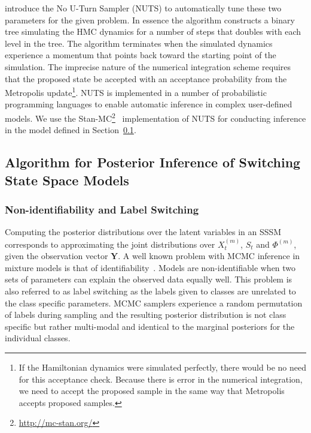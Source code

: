 \cite{hoffman2014no} introduce the No U-Turn Sampler (NUTS) to automatically tune these two parameters for the given problem. In essence the algorithm constructs a binary tree simulating the HMC dynamics for a number of steps that doubles with each level in the tree. The algorithm terminates when the simulated dynamics experience a momentum that points back toward the starting point of the simulation. The imprecise nature of the numerical integration scheme requires that the proposed state be accepted with an acceptance probability from the Metropolis update\footnote{If the Hamiltonian dynamics were simulated perfectly, there would be no need for this acceptance check. Because there is error in the numerical integration, we need to accept the proposed sample in the same way that Metropolis accepts proposed samples.}. NUTS is implemented in a number of probabilistic programming languages to enable automatic inference in complex user-defined models. We use the Stan-MC\footnote{\url{http://mc-stan.org/}}~\citep{carpenter2016stan} implementation of NUTS for conducting inference in the model defined in Section~\ref{sec:posterior_inference_sssm}.

\subsection{Algorithm for Posterior Inference of Switching State Space Models}\label{sec:posterior_inference_sssm}

\subsubsection{Non-identifiability and Label Switching}
Computing the posterior distributions over the latent variables in an SSSM corresponds to approximating the joint distributions over $X_t^{(m)}$, $S_t$ and $\Phi^{(m)}$, given the observation vector $\mathbf{Y}$. A well known problem with MCMC inference in mixture models is that of identifiability~\citep{jasra2005markov}. Models are non-identifiable when two sets of parameters can explain the observed data equally well. This problem is also referred to as label switching as the labels given to classes are unrelated to the class specific parameters. MCMC samplers experience a random permutation of labels during sampling and the resulting posterior distribution is not class specific but rather multi-modal and identical to the marginal posteriors for the individual classes.

